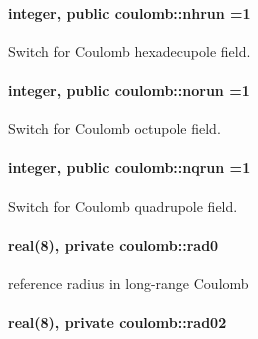 \paragraph[{\texorpdfstring{nhrun}{nhrun}}]{\setlength{\rightskip}{0pt plus 5cm}integer, public coulomb\+::nhrun =1}\hypertarget{namespacecoulomb_a0a85c519a9c3c83e58ad2fd8b41d63cd}{}\label{namespacecoulomb_a0a85c519a9c3c83e58ad2fd8b41d63cd}


Switch for Coulomb hexadecupole field. 

\paragraph[{\texorpdfstring{norun}{norun}}]{\setlength{\rightskip}{0pt plus 5cm}integer, public coulomb\+::norun =1}\hypertarget{namespacecoulomb_ac85c91da1536ba35ab613b60649b2c8e}{}\label{namespacecoulomb_ac85c91da1536ba35ab613b60649b2c8e}


Switch for Coulomb octupole field. 

\paragraph[{\texorpdfstring{nqrun}{nqrun}}]{\setlength{\rightskip}{0pt plus 5cm}integer, public coulomb\+::nqrun =1}\hypertarget{namespacecoulomb_a8f87be32e0e3be0f5c0f72385849bba9}{}\label{namespacecoulomb_a8f87be32e0e3be0f5c0f72385849bba9}


Switch for Coulomb quadrupole field. 

\paragraph[{\texorpdfstring{rad0}{rad0}}]{\setlength{\rightskip}{0pt plus 5cm}real(8), private coulomb\+::rad0\hspace{0.3cm}{\ttfamily [private]}}\hypertarget{namespacecoulomb_a207e347f3d5016b81ac37a1310c2919a}{}\label{namespacecoulomb_a207e347f3d5016b81ac37a1310c2919a}


reference radius in long-\/range Coulomb 

\paragraph[{\texorpdfstring{rad02}{rad02}}]{\setlength{\rightskip}{0pt plus 5cm}real(8), private coulomb\+::rad02\hspace{0.3cm}{\ttfamily [private]}}\hypertarget{namespacecoulomb_a0776ab9d5ae0ca608ddbf4d147063405}{}\label{namespacecoulomb_a0776ab9d5ae0ca608ddbf4d147063405}


